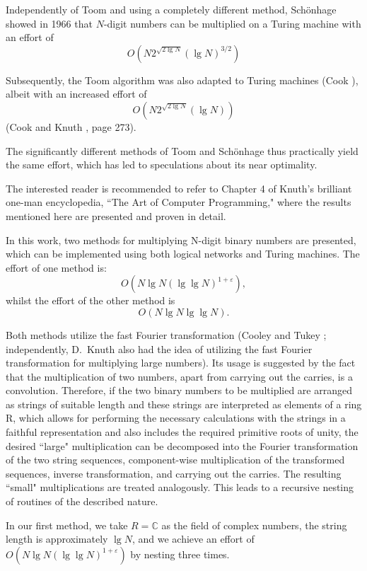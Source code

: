\documentclass{article}
\begin{document}
Independently of Toom and using a completely different method, Schönhage \cite{schoenhage} showed in 1966 that $N$-digit numbers can be multiplied on a Turing machine with an effort of
\[
O\left(N 2^{\sqrt{2 \lg N}} (\lg N)^{3 / 2}\right)
\]

Subsequently, the Toom algorithm was also adapted to Turing machines (Cook \cite{cook1}), albeit with an increased effort of
\[
O\left(N 2^{\sqrt{2 \lg N}} (\lg N)\right)
\]
(Cook \cite{cook1} and Knuth \cite{knuth}, page 273).

The significantly different methods of Toom and Schönhage thus practically yield the same effort, which has led to speculations about its near optimality.

The interested reader is recommended to refer to Chapter 4 of Knuth's brilliant one-man encyclopedia, ``The Art of Computer Programming," where the results mentioned here are presented and proven in detail.

In this work, two methods for multiplying N-digit binary numbers are presented, which can be implemented using both logical networks and Turing machines. The effort of one method is:
\[
O(N \lg N (\lg \lg N)^{1 + \varepsilon}),
\]
whilst the effort of the other method is
\[
O(N \lg N \lg \lg N).
\]

Both methods utilize the fast Fourier transformation (Cooley and Tukey \cite{cooley}; independently, D.\ Knuth also had the idea of utilizing the fast Fourier transformation for multiplying large numbers). Its usage is suggested by the fact that the multiplication of two numbers, apart from carrying out the carries, is a convolution. Therefore, if the two binary numbers to be multiplied are arranged as strings of suitable length and these strings are interpreted as elements of a ring R, which allows for performing the necessary calculations with the strings in a faithful representation and also includes the required primitive roots of unity, the desired ``large" multiplication can be decomposed into the Fourier transformation of the two string sequences, component-wise multiplication of the transformed sequences, inverse transformation, and carrying out the carries. The resulting ``small" multiplications are treated analogously. This leads to a recursive nesting of routines of the described nature.

In our first method, we take $R = \mathbb{C}$ as the field of complex numbers, the string length is approximately $\lg N$, and we achieve an effort of $O(N \lg N(\lg \lg N)^{1 + \varepsilon})$ by nesting three times.
\end{document}
